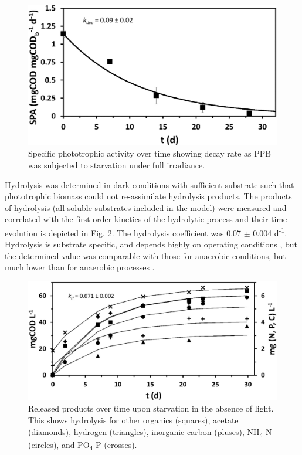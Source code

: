 \begin{figure}[H]
    \hspace*{0cm} 
    \includegraphics[width=\linewidth]{./Chap2/simulations/decay.jpg}
    \caption{Specific phototrophic activity over time showing decay rate as PPB was subjected to starvation under full irradiance.}
    \label{fig:ch2_decay}
\end{figure}

\skippingparagraph
Hydrolysis was determined in dark conditions with sufficient substrate such that phototrophic biomass could not re-assimilate hydrolysis products. The products of hydrolysis (all soluble substrates included in the model) were measured and correlated with the first order kinetics of the hydrolytic process and their time evolution is depicted in Fig. \ref{fig:ch2_hydrolysis}. The hydrolysis coefficient was \num{0.07} $\pm$ \num{0.004} d\textsuperscript{-1}. Hydrolysis is substrate specific, and depends highly on operating conditions \cite{batstone2015}, but the determined value was comparable with those for anaerobic conditions, but much lower than for anaerobic processes \cite{henze2000}. 

\begin{figure}[H]
    \hspace*{0cm} 
    \includegraphics[width=\linewidth]{./Chap2/simulations/hydrolysis.jpg}
    \caption{Released products over time upon starvation in the absence of light. This shows hydrolysis for other organics (squares), acetate (diamonds), hydrogen (triangles), inorganic carbon (pluses), NH\textsubscript{4}-N (circles), and PO\textsubscript{4}-P (crosses).}
    \label{fig:ch2_hydrolysis}
\end{figure}


